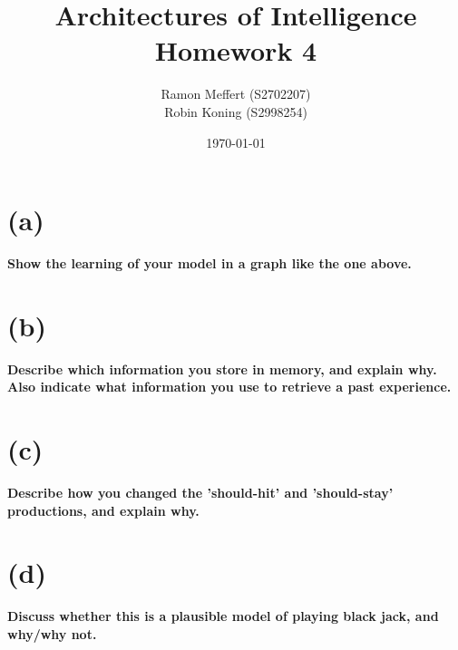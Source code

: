 \documentclass[11pt,a4paper,titlepage]{article}
\title{Architectures of Intelligence \\ Homework 4}
\author{Ramon Meffert (S2702207) \\ Robin Koning (S2998254)}
\date{\today}
\begin{document}
\maketitle{}
\newpage

\section{(a)}
\label{sec:a}

\textbf{Show the learning of your model in a graph like the one
  above.}

\section{(b)}
\label{sec:b}

\textbf{Describe which information you store in memory, and explain
  why. Also indicate what information you use to retrieve a past
  experience.}

\section{(c)}
\label{sec:c}

\textbf{Describe how you changed the 'should-hit' and 'should-stay'
  productions, and explain why.}

\section{(d)}
\label{sec:d}

\textbf{Discuss whether this is a plausible model of playing black
  jack, and why/why not.}
\end{document}
